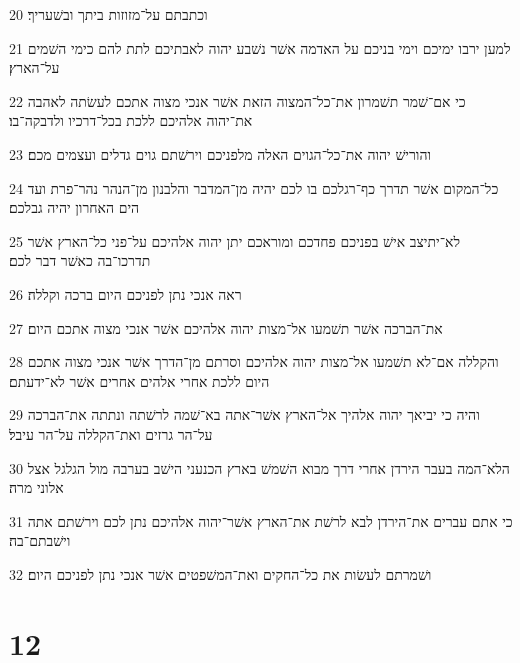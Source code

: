 \par 20 וכתבתם על־מזוזות ביתך ובשׁעריך׃
\par 21 למען ירבו ימיכם וימי בניכם על האדמה אשׁר נשׁבע יהוה לאבתיכם לתת להם כימי השׁמים על־הארץ׃
\par 22 כי אם־שׁמר תשׁמרון את־כל־המצוה הזאת אשׁר אנכי מצוה אתכם לעשׂתה לאהבה את־יהוה אלהיכם ללכת בכל־דרכיו ולדבקה־בו׃
\par 23 והורישׁ יהוה את־כל־הגוים האלה מלפניכם וירשׁתם גוים גדלים ועצמים מכם׃
\par 24 כל־המקום אשׁר תדרך כף־רגלכם בו לכם יהיה מן־המדבר והלבנון מן־הנהר נהר־פרת ועד הים האחרון יהיה גבלכם׃
\par 25 לא־יתיצב אישׁ בפניכם פחדכם ומוראכם יתן יהוה אלהיכם על־פני כל־הארץ אשׁר תדרכו־בה כאשׁר דבר לכם׃
\par 26 ראה אנכי נתן לפניכם היום ברכה וקללה׃
\par 27 את־הברכה אשׁר תשׁמעו אל־מצות יהוה אלהיכם אשׁר אנכי מצוה אתכם היום׃
\par 28 והקללה אם־לא תשׁמעו אל־מצות יהוה אלהיכם וסרתם מן־הדרך אשׁר אנכי מצוה אתכם היום ללכת אחרי אלהים אחרים אשׁר לא־ידעתם׃
\par 29 והיה כי יביאך יהוה אלהיך אל־הארץ אשׁר־אתה בא־שׁמה לרשׁתה ונתתה את־הברכה על־הר גרזים ואת־הקללה על־הר עיבל׃
\par 30 הלא־המה בעבר הירדן אחרי דרך מבוא השׁמשׁ בארץ הכנעני הישׁב בערבה מול הגלגל אצל אלוני מרה׃
\par 31 כי אתם עברים את־הירדן לבא לרשׁת את־הארץ אשׁר־יהוה אלהיכם נתן לכם וירשׁתם אתה וישׁבתם־בה׃
\par 32 ושׁמרתם לעשׂות את כל־החקים ואת־המשׁפטים אשׁר אנכי נתן לפניכם היום׃

\chapter{12}

